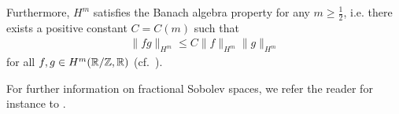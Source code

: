 Furthermore, $H^m$ satisfies the Banach algebra property for any $m\geq \frac 12$, i.e. there exists a positive constant $C = C(m)$ such that 
\begin{align}\label{prop:Banachalgebra}
\|fg\|_{H^m} \leq C \|f\|_{H^m} \|g\|_{H^m}
\end{align}
for all $f,g \in H^m(\mathbb{R}/\mathbb{Z},\mathbb{R})$  (cf.~\cite[Theor.~4.39]{AdamsFournier:2003:SobolevSpaces}).

For further information on fractional Sobolev spaces, we refer the reader for instance to \cite{AdamsFournier:2003:SobolevSpaces,DiNezzaetal:2012:HitchhikersGuide,RunstSickel:1996:SobolevSpacesOfFractionalOrder, Triebel:2010:TheoryOfFunctionSpaces}.

